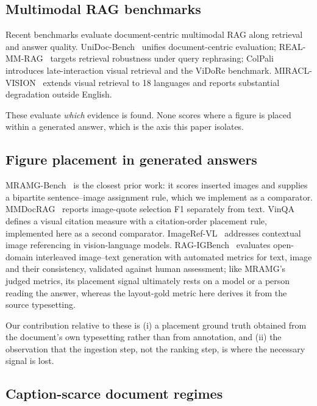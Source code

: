 \documentclass[journal]{IEEEtran}
\begin{document}
\subsection{Multimodal RAG benchmarks}

Recent benchmarks evaluate document-centric multimodal RAG along retrieval and
answer quality. UniDoc-Bench~\cite{unidoc} unifies document-centric evaluation;
REAL-MM-RAG~\cite{realmmrag} targets retrieval robustness under query rephrasing;
ColPali~\cite{colpali} introduces late-interaction visual retrieval and the ViDoRe
benchmark. MIRACL-VISION~\cite{miraclvision} extends visual retrieval to 18
languages and reports substantial degradation outside English.

These evaluate \emph{which} evidence is found. None scores where a figure is
placed within a generated answer, which is the axis this paper isolates.

\subsection{Figure placement in generated answers}

MRAMG-Bench~\cite{mramg} is the closest prior work: it scores inserted images and
supplies a bipartite sentence--image assignment rule, which we implement as a
comparator. MMDocRAG~\cite{mmdocrag} reports image-quote selection F1 separately
from text. VinQA~\cite{vinqa} defines a visual citation measure with a
citation-order placement rule, implemented here as a second comparator.
ImageRef-VL~\cite{imageref} addresses contextual image referencing in
vision-language models. RAG-IGBench~\cite{ragig} evaluates open-domain
interleaved image--text generation with automated metrics for text, image and
their consistency, validated against human assessment; like MRAMG's judged
metrics, its placement signal ultimately rests on a model or a person reading
the answer, whereas the layout-gold metric here derives it from the source
typesetting.

Our contribution relative to these is (i) a placement ground truth obtained from
the document's own typesetting rather than from annotation, and (ii) the
observation that the ingestion step, not the ranking step, is where the necessary
signal is lost.

\subsection{Caption-scarce document regimes}
\end{document}
